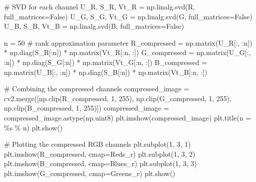 \documentclass[
  letterpaper,
  DIV=11,
  numbers=noendperiod,
  oneside]{scrartcl}
\newenvironment{Shaded}{\begin{snugshade}}{\end{snugshade}}
\newcommand{\CommentTok}[1]{\textcolor[rgb]{0.37,0.37,0.37}{#1}}
\newcommand{\DecValTok}[1]{\textcolor[rgb]{0.68,0.00,0.00}{#1}}
\newcommand{\NormalTok}[1]{\textcolor[rgb]{0.00,0.23,0.31}{#1}}
\newcommand{\OperatorTok}[1]{\textcolor[rgb]{0.37,0.37,0.37}{#1}}
\newcommand{\SpecialCharTok}[1]{\textcolor[rgb]{0.37,0.37,0.37}{#1}}
\newcommand{\StringTok}[1]{\textcolor[rgb]{0.13,0.47,0.30}{#1}}
\newcommand{\VariableTok}[1]{\textcolor[rgb]{0.07,0.07,0.07}{#1}}
\begin{document}
\begin{Shaded}
\begin{Highlighting}[]
\CommentTok{\# SVD for each channel}
\NormalTok{U\_R, S\_R, Vt\_R }\OperatorTok{=}\NormalTok{ np.linalg.svd(R, full\_matrices}\OperatorTok{=}\VariableTok{False}\NormalTok{)}
\NormalTok{U\_G, S\_G, Vt\_G }\OperatorTok{=}\NormalTok{ np.linalg.svd(G, full\_matrices}\OperatorTok{=}\VariableTok{False}\NormalTok{)}
\NormalTok{U\_B, S\_B, Vt\_B }\OperatorTok{=}\NormalTok{ np.linalg.svd(B, full\_matrices}\OperatorTok{=}\VariableTok{False}\NormalTok{)}

\NormalTok{n }\OperatorTok{=} \DecValTok{50}  \CommentTok{\# rank approximation parameter}
\NormalTok{R\_compressed }\OperatorTok{=}\NormalTok{ np.matrix(U\_R[:, :n]) }\OperatorTok{*}\NormalTok{ np.diag(S\_R[:n]) }\OperatorTok{*}\NormalTok{ np.matrix(Vt\_R[:n, :])}
\NormalTok{G\_compressed }\OperatorTok{=}\NormalTok{ np.matrix(U\_G[:, :n]) }\OperatorTok{*}\NormalTok{ np.diag(S\_G[:n]) }\OperatorTok{*}\NormalTok{ np.matrix(Vt\_G[:n, :])}
\NormalTok{B\_compressed }\OperatorTok{=}\NormalTok{ np.matrix(U\_B[:, :n]) }\OperatorTok{*}\NormalTok{ np.diag(S\_B[:n]) }\OperatorTok{*}\NormalTok{ np.matrix(Vt\_B[:n, :])}

\CommentTok{\# Combining the compressed channels}
\NormalTok{compressed\_image }\OperatorTok{=}\NormalTok{ cv2.merge([np.clip(R\_compressed, }\DecValTok{1}\NormalTok{, }\DecValTok{255}\NormalTok{), np.clip(G\_compressed, }\DecValTok{1}\NormalTok{, }\DecValTok{255}\NormalTok{), np.clip(B\_compressed, }\DecValTok{1}\NormalTok{, }\DecValTok{255}\NormalTok{)])}
\NormalTok{compressed\_image }\OperatorTok{=}\NormalTok{ compressed\_image.astype(np.uint8)}
\NormalTok{plt.imshow(compressed\_image)}
\NormalTok{plt.title(}\StringTok{\textquotesingle{}n = }\SpecialCharTok{\%s}\StringTok{\textquotesingle{}} \OperatorTok{\%}\NormalTok{ n)}
\NormalTok{plt.show()}

\CommentTok{\# Plotting the compressed RGB channels}
\NormalTok{plt.subplot(}\DecValTok{1}\NormalTok{, }\DecValTok{3}\NormalTok{, }\DecValTok{1}\NormalTok{)}
\NormalTok{plt.imshow(R\_compressed, cmap}\OperatorTok{=}\StringTok{\textquotesingle{}Reds\_r\textquotesingle{}}\NormalTok{)}
\NormalTok{plt.subplot(}\DecValTok{1}\NormalTok{, }\DecValTok{3}\NormalTok{, }\DecValTok{2}\NormalTok{)}
\NormalTok{plt.imshow(B\_compressed, cmap}\OperatorTok{=}\StringTok{\textquotesingle{}Blues\_r\textquotesingle{}}\NormalTok{)}
\NormalTok{plt.subplot(}\DecValTok{1}\NormalTok{, }\DecValTok{3}\NormalTok{, }\DecValTok{3}\NormalTok{)}
\NormalTok{plt.imshow(G\_compressed, cmap}\OperatorTok{=}\StringTok{\textquotesingle{}Greens\_r\textquotesingle{}}\NormalTok{)}
\NormalTok{plt.show()}
\end{Highlighting}
\end{Shaded}
\end{document}
